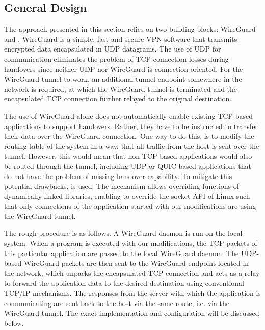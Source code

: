 \subsection{General Design}
The approach presented in this section relies on two building blocks: WireGuard and \ld.
WireGuard is a simple, fast and secure VPN software that transmits encrypted data encapsulated in UDP datagrams.
The use of UDP for communication eliminates the problem of TCP connection losses during handovers since neither UDP nor WireGuard is connection-oriented.
For the WireGuard tunnel to work, an additional tunnel endpoint somewhere in the network is required, at which the WireGuard tunnel is terminated and the encapsulated TCP connection further relayed to the original destination.

The use of WireGuard alone does not automatically enable existing TCP-based applications to support handovers.
Rather, they have to be instructed to transfer their data over the WireGuard connection.
One way to do this, is to modify the routing table of the system in a way, that all traffic from the host is sent over the tunnel.
However, this would mean that non-TCP based applications would also be routed through the tunnel, including UDP or QUIC based applications that do not have the problem of missing handover capability.
To mitigate this potential drawbacks, \ld is used.
The \ld mechanism allows overriding functions of dynamically linked libraries, enabling to override the socket API of Linux such that only connections of the application started with our \ld modifications are using the WireGuard tunnel.

The rough procedure is as follows.
A WireGuard daemon is run on the local system.
When a program is executed with our \ld modifications, the TCP packets of this particular application are passed to the local WireGuard daemon.
The UDP-based WireGuard packets are then sent to the WireGuard endpoint located in the network, which unpacks the encapsulated TCP connection and acts as a relay to forward the application data to the desired destination using conventional TCP/IP mechanisms.
The responses from the server with which the application is communicating are sent back to the host via the same route, i.e. via the WireGuard tunnel.
The exact implementation and configuration will be discussed below.

